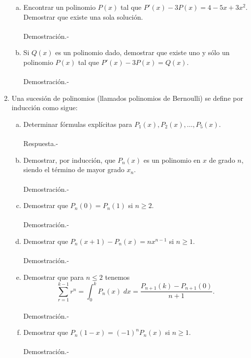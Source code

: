 \begin{enumerate}[\bfseries 1.]
\begin{enumerate}[a)]
	    \item Encontrar un polinomio $P(x)$ tal que $P'(x)-3P(x)=4-5x+3x^2$. Demostrar que existe una sola solución.\\\\
		Demostración.-\;

	    \item Si $Q(x)$ es un polinomio dado, demostrar que existe uno y sólo un polinomio $P(x)$ tal que $P'(x)-3P(x)=Q(x)$.\\\\
		Demostración.-\;

	\end{enumerate}

    \item Una sucesión de polinomios (llamados polinomios de Bernoulli) se define por inducción como sigue:

	\begin{enumerate}[a)]

	    \item Determinar fórmulas explícitas para $P_1(x),P_2(x),\ldots , P_5(x)$.\\\\
		Respuesta.-\;

	    \item Demostrar, por inducción, que $P_n(x)$ es un polinomio en $x$ de grado $n$, siendo el término de mayor grado $x_n$.\\\\
		Demostración.-\;

	    \item Demostrar que $P_n(0)=P_n(1)$ si $n\geq 2$.\\\\
		Demostración.-\;

	    \item Demostrar que $P_n(x+1)-P_n(x)=nx^{n-1}$ si $n\geq 1$.\\\\
		Demostración.-\;

	    \item Demostrar que para $n\leq 2$ tenemos 
	    $$\sum_{r=1}^{k-1}r^n = \int_0^k P_n(x)\; dx = \dfrac{P_{n+1}(k)-P_{n+1}(0)}{n+1}.$$\\
		Demostración.-\;

	    \item  Demostrar que $P_n(1-x)=(-1)^n P_n(x)$ si $n\geq 1$.\\\\
		Demostración.-\;


\end{enumerate}
\end{enumerate}
